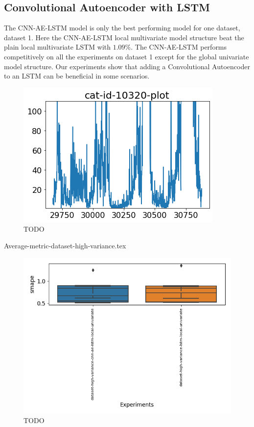 
\subsection{Convolutional Autoencoder with LSTM}
The CNN-AE-LSTM model is only the best performing model for one dataset, dataset 1.
Here the CNN-AE-LSTM local multivariate model structure beat the plain local multivariate LSTM with $1.09\%$.
The CNN-AE-LSTM performs competitively on all the experiments on dataset 1 except for the global univariate model structure.
Our experiments show that adding a Convolutional Autoencoder to an LSTM can be beneficial in some scenarios.


\begin{figure}[h!]
  \centering
  \includegraphics[width=\textwidth]{./figs/code_generated/data_exploration/cat-id-10320-plot.png}
  \hfill
  \caption{TODO}
  \label{fig:cat-id-10320-cnn-ae-beat-lstm}
\end{figure}

{Average-metric-dataset-high-variance.tex}

\begin{figure}[h!]
  \centering
  \includegraphics[width=\textwidth]{./figs/results/boxplot/smape-dataset_high_variance.png}
  \hfill
  \caption{TODO}
  \label{fig:results-smape-dataset-high-variance}
\end{figure}